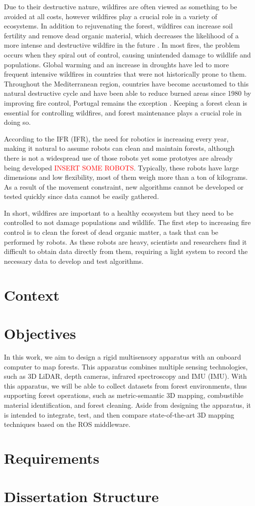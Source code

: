 Due to their destructive nature, wildfires are often viewed as something to be avoided at all costs, however wildfires play a crucial role in a variety of ecosystems. In addition to rejuvenating the forest, wildfires can increase soil fertility and remove dead organic material, which decreases the likelihood of a more intense and destructive wildfire in the future \cite{bond_fires_2017}. In most fires, the problem occurs when they spiral out of control, causing unintended damage to wildlife and populations. Global warming and an increase in droughts have led to more frequent intensive wildfires in countries that were not historically prone to them. Throughout the Mediterranean region, countries have become accustomed to this natural destructive cycle and have been able to reduce burned areas since 1980 by improving fire control, Portugal remains the exception \cite{turco_decreasing_2016}\cite{european_commission_joint_research_centre_forest_2021}. Keeping a forest clean is essential for controlling wildfires, and forest maintenance plays a crucial role in doing so.

According to the \acl{IFR} (\acs{IFR}), the need for robotics is increasing every year, making it natural to assume robots can clean and maintain forests, although there is not a widespread use of those robots yet some prototyes are already being developed \textcolor{red}{INSERT SOME ROBOTS}. Typically, these robots have large dimensions and low flexibility, most of them weigh more than a ton of kilograms. As a result of the movement constraint, new algorithms cannot be developed or tested quickly since data cannot be easily gathered.

In short, wildfires are important to a healthy ecosystem but they need to be controlled to not damage populations and wildlife. The first step to increasing fire control is to clean the forest of dead organic matter, a task that can be performed by robots. As these robots are heavy, scientists and researchers find it difficult to obtain data directly from them, requiring a light system to record the necessary data to develop and test algorithms.

\section{Context}

\section{Objectives}
In this work, we aim to design a rigid multisensory apparatus with an onboard computer to map forests. This apparatus combines multiple sensing technologies, such as 3D \acs{LiDAR}, depth cameras, infrared spectroscopy and \acl{IMU} (\acs{IMU}). With this apparatus, we will be able to collect datasets from forest environments, thus supporting forest operations, such as metric-semantic 3D mapping, combustible material identification, and forest cleaning. Aside from designing the apparatus, it is intended to integrate, test, and then compare state-of-the-art 3D mapping techniques based on the ROS middleware.

\section{Requirements}

\section{Dissertation Structure}
